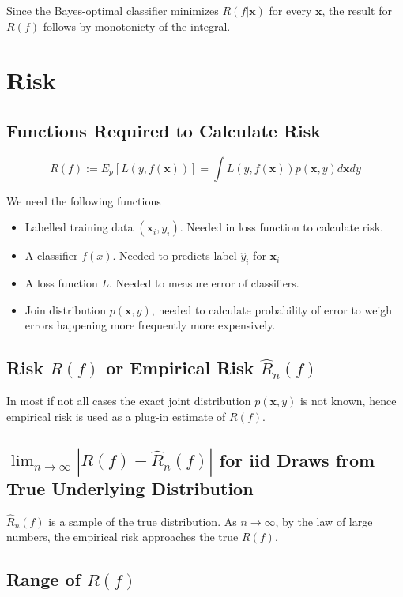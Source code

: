 \documentclass[11pt]{scrartcl}
\begin{document}
Since the Bayes-optimal classifier minimizes $R(f|\mathbf{x})$ for every $\mathbf{x}$, the result for $R(f)$ follows by monotonicty of the integral.

\section{Risk}

\subsection{Functions Required to Calculate Risk}

\[R(f) := E_p[L(y, f(\mathbf{x}))] = \int L(y, f(\mathbf{x}))p(\mathbf{x}, y)d\mathbf{x}dy\]

We need the following functions

\begin{itemize}
\item Labelled training data $(\mathbf{x}_i, y_i)$. Needed in loss function to calculate risk.
\item A classifier $f(x)$. Needed to predicts label $\hat{y}_i$ for $\mathbf{x}_i$
\item A loss function $L$. Needed to measure error of classifiers.
\item Join distribution $p(\mathbf{x}, y)$, needed to calculate probability of error to weigh errors happening more frequently more expensively.
\end{itemize}

\subsection{Risk $R(f)$ or Empirical Risk $\hat{R}_n(f)$}

In most if not all cases the exact joint distribution $p(\mathbf{x}, y)$ is not known, hence empirical risk is used as a plug-in estimate of $R(f)$.

\subsection{$\lim_{n \to \infty} \left| R(f) - \hat{R}_n(f) \right|$ for iid Draws from True Underlying Distribution}

$\hat{R}_n(f)$ is a sample of the true distribution. As $n \to \infty$, by the law of large numbers, the empirical risk approaches the true $R(f)$.

\subsection{Range of $R(f)$}
\end{document}
